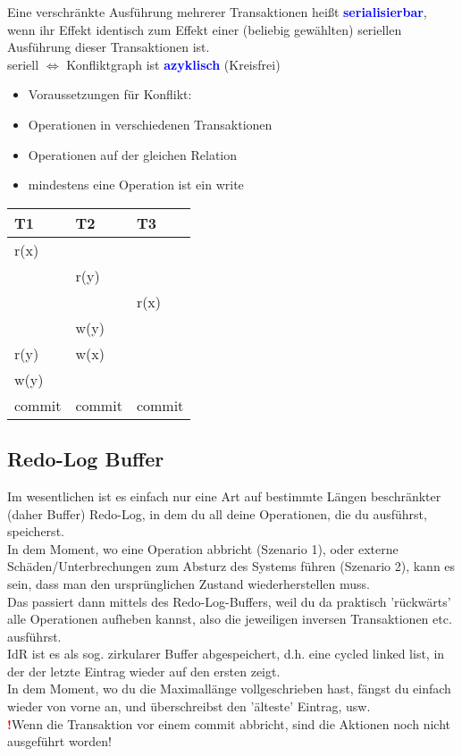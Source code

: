 \documentclass{scrartcl}
\newcommand{\key}[1]{{\textcolor{blue}{\textbf{#1}}}}
\begin{document}
Eine verschränkte Ausführung mehrerer Transaktionen heißt \key{serialisierbar}, wenn ihr Effekt identisch zum Effekt einer (beliebig gewählten) seriellen Ausführung dieser Transaktionen ist. \\
seriell $\Leftrightarrow$ Konfliktgraph ist \key{azyklisch} (Kreisfrei)
\begin{itemize}
	\itemsep0em
	\item[] Voraussetzungen für Konflikt:
	\item Operationen in verschiedenen Transaktionen
	\item Operationen auf der gleichen Relation
	\item mindestens eine Operation ist ein write
\end{itemize}

\begin{tabular}{lll}
	T1&T2&T3\\
	\hline
	r(x) &&\\
	&r(y)&\\
	&&r(x)\\
	&w(y)&\\
	r(y)&w(x)\\
	w(y)&&\\
	commit&commit&commit\\
\end{tabular}

\subsection{Redo-Log Buffer}

Im wesentlichen ist es einfach nur eine Art auf bestimmte Längen beschränkter (daher Buffer) Redo-Log, in dem du all deine Operationen, die du ausführst, speicherst. \\
In dem Moment, wo eine Operation abbricht (Szenario 1), oder externe Schäden/Unterbrechungen zum Absturz des Systems führen (Szenario 2), kann es sein, dass man den ursprünglichen Zustand wiederherstellen muss. \\
Das passiert dann mittels des Redo-Log-Buffers, weil du da praktisch 'rückwärts' alle Operationen aufheben kannst, also die jeweiligen inversen Transaktionen etc. ausführst. \\
IdR ist es als sog. zirkularer Buffer abgespeichert, d.h. eine cycled linked list, in der der letzte Eintrag wieder auf den ersten zeigt. \\
In dem Moment, wo du die Maximallänge vollgeschrieben hast, fängst du einfach wieder von vorne an, und überschreibst den 'älteste' Eintrag, usw. \\
\textbf{\textcolor{red}{!}}Wenn die Transaktion vor einem commit abbricht, sind die Aktionen noch nicht ausgeführt worden!
\end{document}
